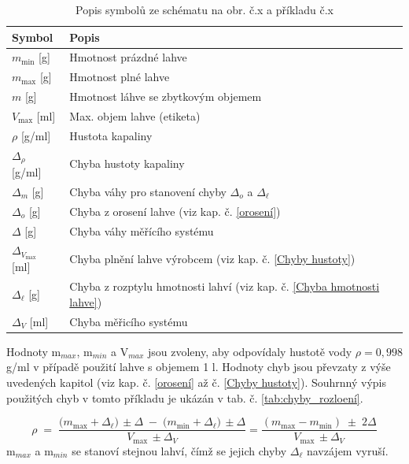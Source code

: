 \begin{table}[H]
    \centering
    \begin{tabular}{|l|l|}
        \hline
        \textbf{Symbol} & \textbf{Popis} \\ \hline \hline
        $m_{\text{min}}$ [g] & Hmotnost prázdné lahve \\ \hline
        $m_{\text{max}}$ [g]& Hmotnost plné lahve \\ \hline
        $m$ [g]& Hmotnost láhve se zbytkovým objemem \\ \hline
        $V_{\text{max}}$ [ml] & Max. objem lahve (etiketa) \\ \hline
        $\rho$ [g/ml]& Hustota kapaliny \\ \hline
        $\Delta_{\rho}$ [g/ml] & Chyba hustoty kapaliny \\ \hline
        $\Delta_m$ [g]& Chyba váhy pro stanovení chyby $\Delta_o$ a $\Delta_\ell$ \\ \hline
        $\Delta_o$ [g]& Chyba z orosení lahve (viz kap. č. \ref{orosení}) \\ \hline
        $\Delta$ [g]& Chyba váhy měřícího systému \\ \hline
        $\Delta_{V_{\text{max}}}$ [ml]& Chyba plnění lahve výrobcem (viz kap. č. \ref{Chyby hustoty}) \\ \hline
        $\Delta_\ell$ [g]& Chyba z rozptylu hmotnosti lahví (viz kap. č. \ref{Chyba hmotnosti lahve}) \\ \hline
        $\Delta_V$ [ml]& Chyba měřicího systému \\ \hline
    \end{tabular}
    \caption{Popis symbolů ze schématu na obr. č.x a příkladu č.x }
    \label{tab:popis-symbolu}
\end{table}
Hodnoty m$_{max}$, m$_{min}$ a V$_{max}$ jsou zvoleny, aby odpovídaly hustotě vody $\rho = 0,998$ g/ml v případě použití lahve s objemem 1 l. Hodnoty chyb jsou převzaty z výše uvedených kapitol (viz kap. č. \ref{orosení} až č. \ref{Chyby hustoty}). Souhrnný výpis použitých chyb v tomto příkladu je ukázán v tab. č. \ref{tab:chyby_rozloení}.

\begin{equation}
    \rho \;=\;
\frac{\bigl(m_{\max}+\Delta_{\ell}\bigr)\,\pm\Delta
      \;-\;\bigl(m_{\min}+\Delta_{\ell}\bigr)\,\pm\Delta}
     {V_{\max}\,\pm\Delta_V} = \frac{(m_{\max}-m_{\min})\;\pm\;2\Delta}
     {V_{\max}\,\pm\Delta_V}   
     \label{hustotaa}
\end{equation}
\bigskip
m$_{max}$ a m$_{min}$ se stanoví stejnou lahví, čímž se jejich chyby $\Delta_\ell$ navzájem vyruší.

